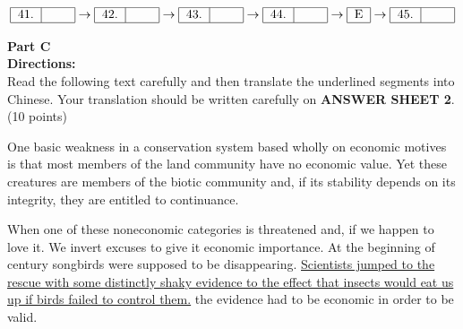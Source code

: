 \[ 
\begin{tabular}{|c|c|}
	\hline
	41. &  \hspace{1.5em} \\
	\hline
\end{tabular}
\rightarrow
\begin{tabular}{|c|c|}
	\hline
	42. &  \hspace{1.5em} \\
	\hline
\end{tabular}
\rightarrow
\begin{tabular}{|c|c|}
	\hline
	43. &  \hspace{1.5em} \\
	\hline
\end{tabular}
\rightarrow
\begin{tabular}{|c|c|}
	\hline
	44. &  \hspace{1.5em} \\
	\hline
\end{tabular}
\rightarrow
\begin{tabular}{|c|}
	\hline
	E \\
	\hline
\end{tabular}
\rightarrow
\begin{tabular}{|c|c|}
	\hline
	45. &  \hspace{1.5em} \\
	\hline
\end{tabular}
 \]


\phantom{ \linefill \linefill \linefill \linefill \linefill}


\newpage
\noindent
\textbf{Part C}\\
\textbf{Directions:}\\
Read the following text carefully and then translate the underlined
segments into Chinese. Your translation should be written carefully on
\textbf{ANSWER SHEET 2}. (10 points)



\TiGanSpace


One basic weakness in a conservation system based wholly on economic
motives is that most members of the land community have no economic
value. Yet these creatures are members of the biotic community and, if
its stability depends on its integrity, they are entitled to
continuance.

When one of these noneconomic categories is threatened and, if we happen
to love it. We invert excuses to give it economic importance. At the
beginning of century songbirds were supposed to be disappearing.  \transnum 
\uline{Scientists jumped to the rescue with some distinctly shaky
	evidence to the effect that insects would eat us up if birds failed to
	control them.} the evidence had to be economic in order to be valid.

